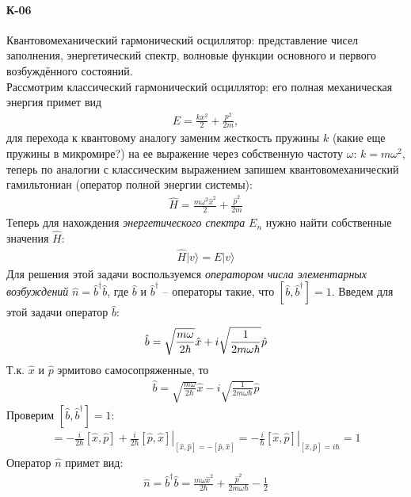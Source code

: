 \documentclass[__main__.tex]{subfiles}
\begin{document}
\paragraph{К-06}
Квантовомеханический гармонический осциллятор: представление чисел заполнения, энергетический спектр, волновые функции основного и первого возбуждённого состояний.\\

Рассмотрим классический гармонический осциллятор: его полная механическая энергия примет вид
\begin{gather*}
	E = \frac{kx^2}{2}+\frac{p^2}{2m},
\end{gather*}
для перехода к квантовому аналогу заменим жесткость пружины $k$ (какие еще пружины в микромире?) на ее выражение через собственную частоту $\omega$: $k=m\omega^2$, теперь по аналогии с классическим выражением запишем квантовомеханический гамильтониан (оператор полной энергии системы):
\begin{gather*}
	\hat{H} = \frac{m\omega^2\hat{x}^2}{2}+\frac{\hat{p}^2}{2m}
\end{gather*}
Теперь для нахождения \textit{энергетического спектра} $E_n$ нужно найти собственные значения $\hat{H}$:
\begin{gather*}
	\hat{H}|v\rangle = E|v\rangle
\end{gather*}
Для решения этой задачи воспользуемся \textit{оператором числа элементарных возбуждений} $\hat{n}=\hat{b}^\dagger\hat{b}$, где $\hat{b}$ и $\hat{b}^\dagger$ -- операторы такие, что $[\hat{b},\hat{b}^\dagger]=1$. Введем для этой задачи оператор $\hat{b}$: 
\begin{gather}
	\hat{b} = \sqrt{\frac{m\omega}{2\hbar}}\hat{x} + i\sqrt{\frac{1}{2m\omega\hbar}}\hat{p}
	\llabel{_10:b}
\end{gather}
Т.к. $\hat{x}$ и $\hat{p}$ эрмитово самосопряженные, то
\begin{gather*}
	\hat{b} = \sqrt{\frac{m\omega}{2\hbar}}\hat{x} - i\sqrt{\frac{1}{2m\omega\hbar}}\hat{p}
\end{gather*}
Проверим $[\hat{b},\hat{b}^\dagger]=1$:
\begin{gather*}
	[\hat{b},\hat{b}^\dagger]
	=
	\left.
	-\frac{i}{2\hbar}[\hat{x},\hat{p}]+\frac{i}{2\hbar}[\hat{p},\hat{x}]
	\right|_{[\hat{x},\hat{p}]=-[\hat{p},\hat{x}]}
	=
	\left.
	-\frac{i}{\hbar}[\hat{x},\hat{p}]
	\right|_{[\hat{x},\hat{p}]=i\hbar}
	=
	1
\end{gather*}
Оператор $\hat{n}$ примет вид:
\begin{gather*}
	\hat{n}=\hat{b}^\dagger\hat{b}=\frac{m\omega\hat{x}^2}{2\hbar}+\frac{\hat{p}^2}{2m\omega\hbar}-\frac{1}{2}
\end{gather*}
\end{document}
